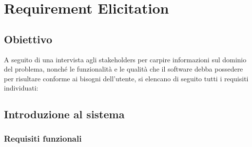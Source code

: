 
\chapter{Requirement Elicitation}

    \section{Obiettivo}
        A seguito di una intervista agli stakeholders per carpire informazioni sul dominio del problema, nonché le funzionalità e le qualità che il software debba possedere per risultare conforme ai bisogni dell'utente, si elencano di seguito tutti i requisiti individuati:

    \section{Introduzione al sistema} %

        \subsection{Requisiti funzionali}
